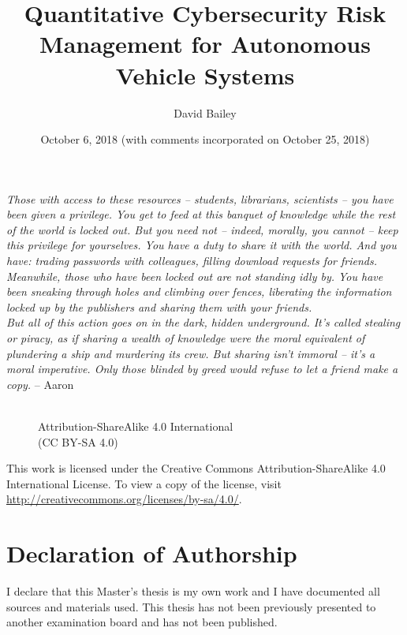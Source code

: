 \documentclass{article}
\title{Quantitative Cybersecurity Risk Management for Autonomous Vehicle Systems}
\author{David Bailey}
\date{October 6, 2018 (with comments incorporated on October 25, 2018)}
\begin{document}
\maketitle
\newpage

\begin{mdframed}
    \emph{Those with access to these resources -- students, librarians, scientists -- you have been given a privilege. You get to feed at this banquet of knowledge while the rest of the world is locked out. But you need not -- indeed, morally, you cannot -- keep this privilege for yourselves. You have a duty to share it with the world. And you have: trading passwords with colleagues, filling download requests for friends.} \\
    \emph{\indent Meanwhile, those who have been locked out are not standing idly by. You have been sneaking through holes and climbing over fences, liberating the information locked up by the publishers and sharing them with your friends.} \\
    \emph{\indent But all of this action goes on in the dark, hidden underground. It's called stealing or piracy, as if sharing a wealth of knowledge were the moral equivalent of plundering a ship and murdering its crew. But sharing isn't immoral -- it's a moral imperative. Only those blinded by greed would refuse to let a friend make a copy.} -- Aaron \cite{swartz_guerilla_2008}
\end{mdframed}

\begin{figure}[h] \centering
    \def\svgwidth{1.5cm}
    
    \def\svgwidth{1.5cm}
    
    \def\svgwidth{1.5cm}
     \\
    \large Attribution-ShareAlike 4.0 International \\
    (CC BY-SA 4.0)
\end{figure}

\noindent This work is licensed under the Creative Commons Attribution-ShareAlike 4.0 International License. To view a copy of the license, visit \url{http://creativecommons.org/licenses/by-sa/4.0/}.

\newpage
\tableofcontents

\newpage
\listoffigures

\newpage
\listoftables

\newpage
\section*{Declaration of Authorship}
I declare that this Master's thesis is my own work and I have documented all sources and materials used. This thesis has not been previously presented to another examination board and has not been published.
\end{document}
